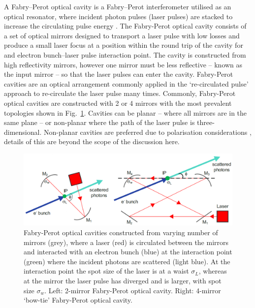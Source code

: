 \documentclass[../main.tex]{subfiles}
\begin{document}
A Fabry--Perot optical cavity is a Fabry--Perot interferometer \cite{fabry1901new} utilised as an optical resonator, where incident photon pulses (laser pulses) are stacked to increase the circulating pulse energy \cite{schawlow1958infrared,variola2011luminosity}.
The Fabry-Perot optical cavity consists of a set of optical mirrors designed to transport a laser pulse with low losses and produce a small laser focus at a position within the round trip of the cavity for and electron bunch--laser pulse interaction point. The cavity is constructed from high reflectivity mirrors, however one mirror must be less reflective -- known as the input mirror -- so that the laser pulses can enter the cavity. Fabry-Perot cavities are an optical arrangement commonly applied in the `re-circulated pulse' approach to re-circulate the laser pulse many times. Commonly, Fabry-Perot optical cavities are constructed with 2 or 4 mirrors with the most prevalent topologies shown in Fig.~\ref{fig:2_mirror_4_mirror}. Cavities can be planar -- where all mirrors are in the same plane -- or non-planar where the path of the laser pulse is three-dimensional. Non-planar cavities are preferred due to polarisation considerations \cite{zomer2009polarization}, details of this are beyond the scope of the discussion here.
\begin{figure}[!h]
\centering
\includegraphics[width=\textwidth]{Figures/Photon_Production_by_Inverse_Compton_Scattering/2_mirror_4_mirror.pdf}
\caption{Fabry-Perot optical cavities constructed from varying number of mirrors (grey), where a laser (red) is circulated between the mirrors and interacted with an electron bunch (blue) at the interaction point (green) where the incident photons are scattered (light blue). At the interaction point the spot size of the laser is at a waist $\sigma_{L}$, whereas at the mirror the laser pulse has diverged and is larger, with spot size $\sigma_{w}$. Left: 2-mirror Fabry-Perot optical cavity. Right: 4-mirror `bow-tie' Fabry-Perot optical cavity.}
\label{fig:2_mirror_4_mirror}
\end{figure}
\end{document}
